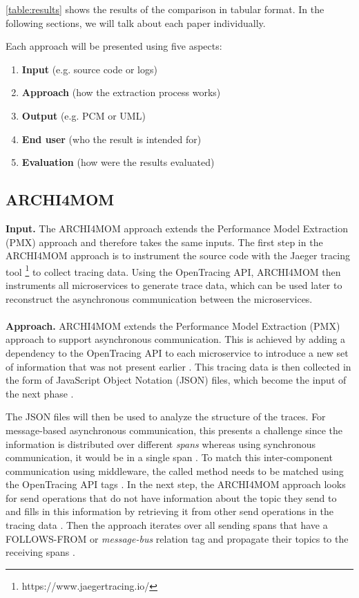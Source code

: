\autoref{table:results} shows the results of the comparison in tabular format.
In the following sections, we will talk about each paper individually.

Each approach will be presented using five aspects:
\begin{enumerate}
	\item \textbf{Input} (e.g. source code or logs)
	\item \textbf{Approach} (how the extraction process works)
	\item \textbf{Output} (e.g. PCM or UML)
	\item \textbf{End user} (who the result is intended for)
	\item \textbf{Evaluation} (how were the results evaluated)
\end{enumerate}

\subsection{ARCHI4MOM}
\label{sec:Results:ARCHI4MOM}
\textbf{Input.}
The ARCHI4MOM approach extends the Performance Model Extraction (PMX) approach \cite{Walter2017PMX,Singh2022ARCHI4MOM} and therefore takes the same inputs.
The first step in the ARCHI4MOM approach is to instrument the source code with the Jaeger tracing tool \footnote{https://www.jaegertracing.io/} to collect tracing data.
Using the OpenTracing API, ARCHI4MOM then instruments all microservices to generate trace data, which can be used later to reconstruct the asynchronous communication between the microservices. \cite{Singh2022ARCHI4MOM} %
\\ \\
\textbf{Approach.}
ARCHI4MOM extends the Performance Model Extraction (PMX) approach \cite{Walter2017PMX,Singh2022ARCHI4MOM} to support asynchronous communication.
This is achieved by adding a dependency to the OpenTracing API to each microservice to introduce a new set of information that was not present earlier \cite{Singh2022ARCHI4MOM}.
This tracing data is then collected in the form of JavaScript Object Notation (JSON) files, which become the input of the next phase \cite{Singh2022ARCHI4MOM}.

The JSON files will then be used to analyze the structure of the traces.
For message-based asynchronous communication, this presents a challenge since the information is distributed over different \textit{spans} whereas using synchronous communication, it would be in a single span \cite{Singh2022ARCHI4MOM}.
To match this inter-component communication using middleware, the called method needs to be matched using the OpenTracing API tags \cite{Singh2022ARCHI4MOM}.
In the next step, the ARCHI4MOM approach looks for send operations that do not have information about the topic  they send to and fills in this information by retrieving it from other send operations in the tracing data \cite{Singh2022ARCHI4MOM}.
Then the approach iterates over all sending spans that have a FOLLOWS-FROM or \textit{message-bus} relation  tag and propagate their topics to the receiving spans \cite{Singh2022ARCHI4MOM}.

